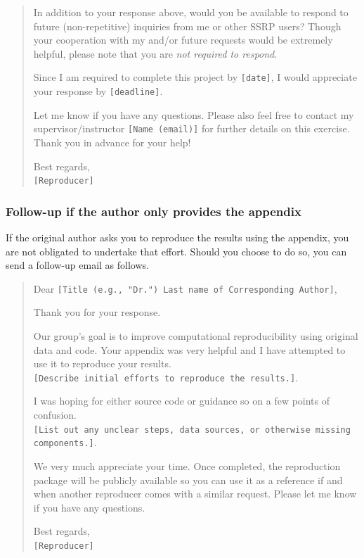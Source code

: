 \documentclass[
]{book}
\begin{document}
\begin{quote}
In addition to your response above, would you be available to respond to future (non-repetitive) inquiries from me or other SSRP users? Though your cooperation with my and/or future requests would be extremely helpful, please note that you are \emph{not required to respond}.

Since I am required to complete this project by \texttt{{[}date{]}}, I would appreciate your response by \texttt{{[}deadline{]}}.

Let me know if you have any questions. Please also feel free to contact my supervisor/instructor \texttt{{[}Name\ (email){]}} for further details on this exercise. Thank you in advance for your help!

Best regards,\\
\texttt{{[}Reproducer{]}}
\end{quote}

\hypertarget{follow-up-if-the-author-only-provides-the-appendix}{%
\subsubsection{Follow-up if the author only provides the appendix}\label{follow-up-if-the-author-only-provides-the-appendix}}

If the original author asks you to reproduce the results using the appendix, you are not obligated to undertake that effort. Should you choose to do so, you can send a follow-up email as follows.

\begin{quote}
Dear \texttt{{[}Title\ (e.g.,\ "Dr.")\ Last\ name\ of\ Corresponding\ Author{]}},

Thank you for your response.

Our group's goal is to improve computational reproducibility using original data and code. Your appendix was very helpful and I have attempted to use it to reproduce your results.\texttt{{[}Describe\ initial\ efforts\ to\ reproduce\ the\ results.{]}}.

I was hoping for either source code or guidance so on a few points of confusion. \texttt{{[}List\ out\ any\ unclear\ steps,\ data\ sources,\ or\ otherwise\ missing\ components.{]}}.

We very much appreciate your time. Once completed, the reproduction package will be publicly available so you can use it as a reference if and when another reproducer comes with a similar request. Please let me know if you have any questions.

Best regards,\\
\texttt{{[}Reproducer{]}}
\end{quote}
\end{document}
